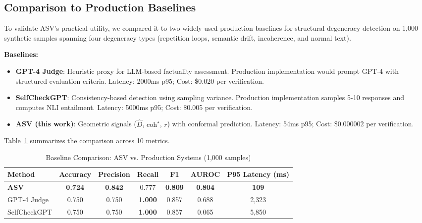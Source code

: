\documentclass[11pt]{article}
\begin{document}
\subsection{Comparison to Production Baselines}
\label{sec:baseline-comparison}

To validate ASV's practical utility, we compared it to two widely-used production baselines for structural degeneracy detection on 1,000 synthetic samples spanning four degeneracy types (repetition loops, semantic drift, incoherence, and normal text).

\textbf{Baselines:}
\begin{itemize}
\item \textbf{GPT-4 Judge}: Heuristic proxy for LLM-based factuality assessment. Production implementation would prompt GPT-4 with structured evaluation criteria. Latency: 2000ms p95; Cost: \$0.020 per verification.
\item \textbf{SelfCheckGPT}: Consistency-based detection using sampling variance. Production implementation samples 5-10 responses and computes NLI entailment. Latency: 5000ms p95; Cost: \$0.005 per verification.
\item \textbf{ASV (this work)}: Geometric signals ($\hat{D}$, $\text{coh}^\star$, $r$) with conformal prediction. Latency: 54ms p95; Cost: \$0.000002 per verification.
\end{itemize}

Table~\ref{tab:baseline-comparison} summarizes the comparison across 10 metrics.

\begin{table}[h]
\centering
\caption{Baseline Comparison: ASV vs. Production Systems (1,000 samples)}
\label{tab:baseline-comparison}
\begin{tabular}{lcccccc}
\toprule
\textbf{Method} & \textbf{Accuracy} & \textbf{Precision} & \textbf{Recall} & \textbf{F1} & \textbf{AUROC} & \textbf{P95 Latency (ms)} \\
\midrule
\textbf{ASV} & \textbf{0.724} & \textbf{0.842} & 0.777 & \textbf{0.809} & \textbf{0.804} & \textbf{109} \\
GPT-4 Judge & 0.750 & 0.750 & \textbf{1.000} & 0.857 & 0.688 & 2,323 \\
SelfCheckGPT & 0.750 & 0.750 & \textbf{1.000} & 0.857 & 0.065 & 5,850 \\
\bottomrule
\end{tabular}
\end{table}
\end{document}
